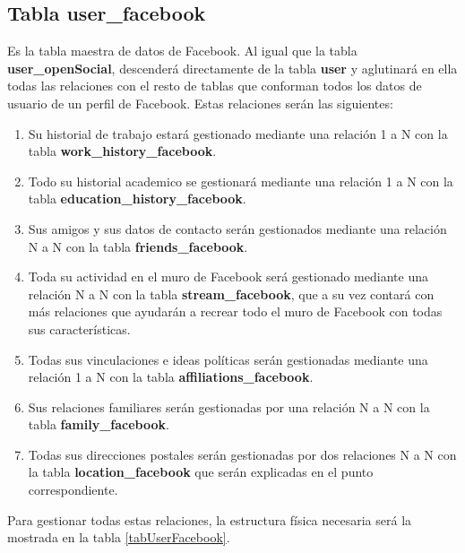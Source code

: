 \subsection{Tabla user\_facebook}
Es la tabla maestra de datos de Facebook. Al igual que la tabla \textbf{user\_openSocial}, descenderá directamente de la tabla \textbf{user} y aglutinará en ella todas las relaciones con el resto de tablas que conforman todos los datos de usuario de un perfil de Facebook. Estas relaciones serán las siguientes:
\begin{enumerate}
\item Su historial de trabajo estará gestionado mediante una relación 1 a N con la tabla \textbf{work\_history\_facebook}.
\item Todo su historial academico se gestionará mediante una relación 1 a N con la tabla \textbf{education\_history\_facebook}.
\item Sus amigos y sus datos de contacto serán gestionados mediante una relación N a N con la tabla \textbf{friends\_facebook}.
\item Toda su actividad en el muro de Facebook será gestionado mediante una relación N a N con la tabla \textbf{stream\_facebook}, que a su vez contará con más relaciones que ayudarán a recrear todo el muro de Facebook con todas sus características.
\item Todas sus vinculaciones e ideas políticas serán gestionadas mediante una relación 1 a N con la tabla \textbf{affiliations\_facebook}.
\item Sus relaciones familiares serán gestionadas por una relación N a N con la tabla \textbf{family\_facebook}.
\item Todas sus direcciones postales serán gestionadas por dos relaciones N a N con la tabla \textbf{location\_facebook} que serán explicadas en el punto correspondiente.
\end{enumerate}
\bigskip
\par
Para gestionar todas estas relaciones, la estructura física necesaria será la mostrada en la tabla \ref{tabUserFacebook}.
\bigskip
\par

